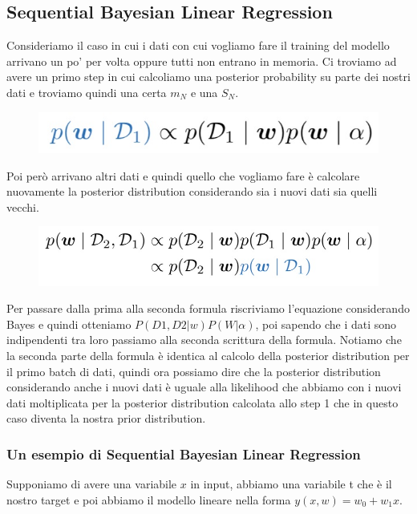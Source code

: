 \documentclass[14pt]{extreport}
\begin{document}
\subsection{Sequential Bayesian Linear Regression}

Consideriamo il caso in cui i dati con cui vogliamo fare il training del modello arrivano un po' per volta oppure tutti non entrano in memoria. Ci
troviamo ad avere un primo step in cui calcoliamo una posterior probability su parte dei nostri dati e troviamo quindi una certa $m_N$ e una $S_N$.

\begin{figure}[H]
	\centering
	\includegraphics[width=0.7\linewidth]{130.jpeg}
\end{figure}

Poi però arrivano altri dati e quindi quello che vogliamo fare è calcolare nuovamente la posterior distribution considerando sia i nuovi dati sia
quelli vecchi.
\begin{figure}[H]
	\centering
	\includegraphics[width=0.7\linewidth]{131.jpeg}
\end{figure}

Per passare dalla prima alla seconda formula riscriviamo l'equazione considerando Bayes e quindi otteniamo $P(D1,D2 | w) P(W|\alpha)$, poi sapendo che
i dati sono indipendenti tra loro passiamo alla seconda scrittura della formula. Notiamo che la seconda parte della formula è identica al calcolo
della posterior distribution per il primo batch di dati, quindi ora possiamo dire che la posterior distribution considerando anche i nuovi dati è
uguale alla likelihood che abbiamo con i nuovi dati moltiplicata per la posterior distribution calcolata allo step 1 che in questo caso diventa la
nostra prior distribution.

\subsubsection{Un esempio di Sequential Bayesian Linear Regression}

Supponiamo di avere una variabile $x$ in input, abbiamo una variabile t che è il nostro target e poi abbiamo il modello lineare nella forma $y(x,w) =
w_0 + w_1x$.
\end{document}
